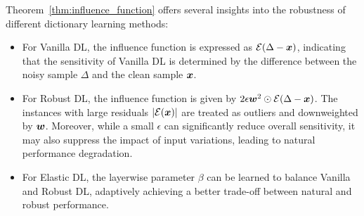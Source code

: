 Theorem~\ref{thm:influence_function} offers several insights into the robustness of different dictionary learning methods:
\vspace{-0.1in}
\begin{itemize}[left=0.0em] 
\item For Vanilla DL, the influence function is expressed as ${\mathcal{E}}(\Delta - {\bm{x}})$, indicating that the sensitivity of Vanilla DL is determined by the difference between the noisy sample $\Delta$ and the clean sample ${\bm{x}}$.
\item For Robust DL, the influence function is given by $2\epsilon {\bm{w}}^2 \odot {\mathcal{E}}(\Delta - {\bm{x}})$. The instances with large residuals $|{\mathcal{E}}({\bm{x}})|$ are treated as outliers and downweighted by ${\bm{w}}$. Moreover, while a small $\epsilon$ can significantly reduce overall sensitivity, it may also suppress the impact of input variations,  leading to natural performance degradation.


\item 
For Elastic DL, the layerwise parameter $\beta$ can be learned to balance Vanilla and Robust DL, adaptively achieving a better trade-off between natural and robust performance.


\end{itemize}


